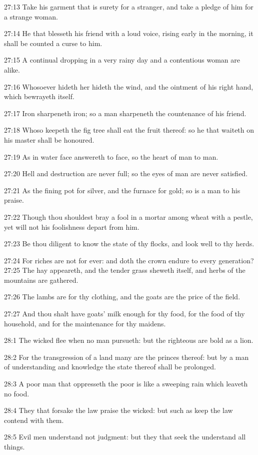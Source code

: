 27:13 Take his garment that is surety for a stranger, and take a pledge of him for a strange woman.

27:14 He that blesseth his friend with a loud voice, rising early in the morning, it shall be counted a curse to him.

27:15 A continual dropping in a very rainy day and a contentious woman are alike.

27:16 Whosoever hideth her hideth the wind, and the ointment of his right hand, which bewrayeth itself.

27:17 Iron sharpeneth iron; so a man sharpeneth the countenance of his friend.

27:18 Whoso keepeth the fig tree shall eat the fruit thereof: so he that waiteth on his master shall be honoured.

27:19 As in water face answereth to face, so the heart of man to man.

27:20 Hell and destruction are never full; so the eyes of man are never satisfied.

27:21 As the fining pot for silver, and the furnace for gold; so is a man to his praise.

27:22 Though thou shouldest bray a fool in a mortar among wheat with a pestle, yet will not his foolishness depart from him.

27:23 Be thou diligent to know the state of thy flocks, and look well to thy herds.

27:24 For riches are not for ever: and doth the crown endure to every generation?  27:25 The hay appeareth, and the tender grass sheweth itself, and herbs of the mountains are gathered.

27:26 The lambs are for thy clothing, and the goats are the price of the field.

27:27 And thou shalt have goats' milk enough for thy food, for the food of thy household, and for the maintenance for thy maidens.

28:1 The wicked flee when no man pursueth: but the righteous are bold as a lion.

28:2 For the transgression of a land many are the princes thereof: but by a man of understanding and knowledge the state thereof shall be prolonged.

28:3 A poor man that oppresseth the poor is like a sweeping rain which leaveth no food.

28:4 They that forsake the law praise the wicked: but such as keep the law contend with them.

28:5 Evil men understand not judgment: but they that seek the \LORD understand all things.

